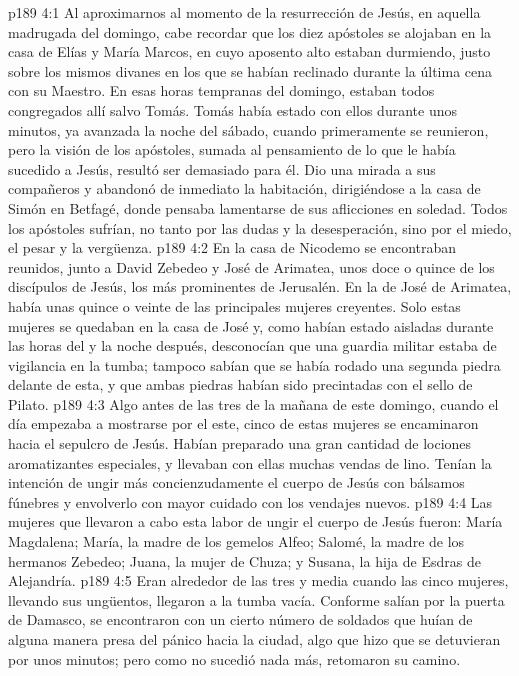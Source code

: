 \vs p189 4:1 Al aproximarnos al momento de la resurrección de Jesús, en aquella madrugada del domingo, cabe recordar que los diez apóstoles se alojaban en la casa de Elías y María Marcos, en cuyo aposento alto estaban durmiendo, justo sobre los mismos divanes en los que se habían reclinado durante la última cena con su Maestro. En esas horas tempranas del domingo, estaban todos congregados allí salvo Tomás. Tomás había estado con ellos durante unos minutos, ya avanzada la noche del sábado, cuando primeramente se reunieron, pero la visión de los apóstoles, sumada al pensamiento de lo que le había sucedido a Jesús, resultó ser demasiado para él. Dio una mirada a sus compañeros y abandonó de inmediato la habitación, dirigiéndose a la casa de Simón en Betfagé, donde pensaba lamentarse de sus aflicciones en soledad. Todos los apóstoles sufrían, no tanto por las dudas y la desesperación, sino por el miedo, el pesar y la vergüenza.
\vs p189 4:2 \pc En la casa de Nicodemo se encontraban reunidos, junto a David Zebedeo y José de Arimatea, unos doce o quince de los discípulos de Jesús, los más prominentes de Jerusalén. En la de José de Arimatea, había unas quince o veinte de las principales mujeres creyentes. Solo estas mujeres se quedaban en la casa de José y, como habían estado aisladas durante las horas del  y la noche después, desconocían que una guardia militar estaba de vigilancia en la tumba; tampoco sabían que se había rodado una segunda piedra delante de esta, y que ambas piedras habían sido precintadas con el sello de Pilato.
\vs p189 4:3 Algo antes de las tres de la mañana de este domingo, cuando el día empezaba a mostrarse por el este, cinco de estas mujeres se encaminaron hacia el sepulcro de Jesús. Habían preparado una gran cantidad de lociones aromatizantes especiales, y llevaban con ellas muchas vendas de lino. Tenían la intención de ungir más concienzudamente el cuerpo de Jesús con bálsamos fúnebres y envolverlo con mayor cuidado con los vendajes nuevos.
\vs p189 4:4 Las mujeres que llevaron a cabo esta labor de ungir el cuerpo de Jesús fueron: María Magdalena; María, la madre de los gemelos Alfeo; Salomé, la madre de los hermanos Zebedeo; Juana, la mujer de Chuza; y Susana, la hija de Esdras de Alejandría.
\vs p189 4:5 Eran alrededor de las tres y media cuando las cinco mujeres, llevando sus ungüentos, llegaron a la tumba vacía. Conforme salían por la puerta de Damasco, se encontraron con un cierto número de soldados que huían de alguna manera presa del pánico hacia la ciudad, algo que hizo que se detuvieran por unos minutos; pero como no sucedió nada más, retomaron su camino.
